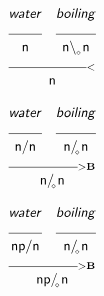 \documentclass{article}
\newcommand{\deriv}[2]
{  \renewcommand{\arraystretch}{.5}
$\begin{array}[t]{*{#1}{c}}
     #2
   \end{array}$ }
\newcommand{\gf}[1]{\textsf{\textsl{#1}}}
\newcommand{\cf}[1]{\mbox{\ensuremath{\cfont{#1}}}}
\newcommand{\uline}[1]
{\mc{#1}{\hrulefill} }
\newcommand{\mc}[2]
  {\multicolumn{#1}{c}{#2}}
\newcommand{\cfont}{\mathsf}
\newcommand{\bs}{\backslash}
\newcommand{\subsa}[1]{\hspace{-0.75mm}_{_{#1}}}
\newcommand{\subsb}[1]{\hspace{-0.10mm}_{_{#1}}}
\begin{document}
\deriv{2}{
\gf{water} & \gf{boiling} \\
\uline{1} & \uline{1} \\
\cf{n} & \cf{n\bs \subsb{\diamond} n} \\
 \mc{2} {\hrulefill_{<}} \\
 \mc{2}{\cf{n}} \\
}

\vspace{5mm}

\deriv{2}{
\gf{water} & \gf{boiling} \\
\uline{1} & \uline{1} \\
\cf{n/ n} & \cf{n/ \subsa{\diamond} n} \\
 \mc{2} {\hrulefill_{>\mathbf{B}}}\\
 \mc{2}{\cf{n/ \subsa{\diamond} n}} \\
}

\vspace{5mm}

\deriv{2}{
\gf{water} & \gf{boiling} \\
\uline{1} & \uline{1} \\
\cf{np/ n} & \cf{n/ \subsa{\diamond} n} \\
 \mc{2} {\hrulefill_{>\mathbf{B}}}\\
 \mc{2}{\cf{np/ \subsa{\diamond} n}} \\
}

\vspace{5mm}
\end{document}
